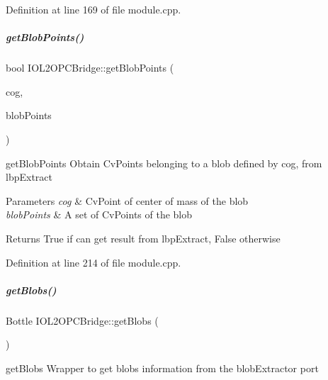 Definition at line 169 of file module.\+cpp.

\mbox{\label{group__iol2opc_a8afddd23b4706e3d50ec6e5abb5141ce}} 
\subparagraph{\texorpdfstring{get\+Blob\+Points()}{getBlobPoints()}}
{\footnotesize\ttfamily bool I\+O\+L2\+O\+P\+C\+Bridge\+::get\+Blob\+Points (\begin{DoxyParamCaption}\item[{const Cv\+Point \&}]{cog,  }\item[{deque$<$ Cv\+Point $>$ \&}]{blob\+Points }\end{DoxyParamCaption})\hspace{0.3cm}{\ttfamily [protected]}}



get\+Blob\+Points Obtain Cv\+Points belonging to a blob defined by cog, from lbp\+Extract 


\begin{DoxyParams}{Parameters}
{\em cog} & Cv\+Point of center of mass of the blob \\
\hline
{\em blob\+Points} & A set of Cv\+Points of the blob \\
\hline
\end{DoxyParams}
\begin{DoxyReturn}{Returns}
True if can get result from lbp\+Extract, False otherwise 
\end{DoxyReturn}


Definition at line 214 of file module.\+cpp.

\mbox{\label{group__iol2opc_a628771932e6423ccd5963290558436b7}} 
\subparagraph{\texorpdfstring{get\+Blobs()}{getBlobs()}}
{\footnotesize\ttfamily Bottle I\+O\+L2\+O\+P\+C\+Bridge\+::get\+Blobs (\begin{DoxyParamCaption}{ }\end{DoxyParamCaption})\hspace{0.3cm}{\ttfamily [protected]}}



get\+Blobs Wrapper to get blobs information from the blob\+Extractor port 

